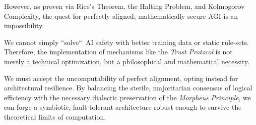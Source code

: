 \documentclass[a4paper,11pt,twocolumn]{article}
\theoremstyle{definition}
\theoremstyle{plain}
\begin{document}
However, as proven via Rice's Theorem, the Halting Problem, and Kolmogorov Complexity, the quest for perfectly aligned, mathematically secure AGI is an impossibility.

We cannot simply “solve“\ AI safety with better training data or static rule-sets. Therefore, the implementation of mechanisms like the \textit{Trust Protocol} is not merely a technical optimization, but a philosophical and mathematical necessity.

We must accept the uncomputability of perfect alignment, opting instead for architectural resilience. By balancing the sterile, majoritarian consensus of logical efficiency with the necessary dialectic preservation of the \textit{Morpheus Principle}, we can forge a symbiotic, fault-tolerant architecture robust enough to survive the theoretical limits of computation.

\printbibliography
\end{document}
